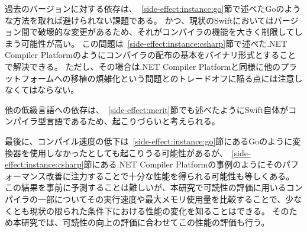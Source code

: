 過去のバージョンに対する依存は、~\ref{side-effect:instance:go}節で述べたGoのような方法を取れば避けられない課題である。
かつ、現状のSwiftにおいてはバージョン間で破壊的な変更があるため、それがコンパイラの機能を大きく制限してしまう可能性が高い。
この問題は~\ref{side-effect:instance:csharp}節で述べた.NET Compiler Platformのようにコンパイラの配布の基本をバイナリ形式とすることで解決できる。
ただし、その場合は.NET Compiler Platformと同様に他のプラットフォームへの移植の煩雑化という問題とのトレードオフに陥る点には注意しなくてはならない。

他の低級言語への依存は、~\ref{side-effect:merit}節でも述べたようにSwift自体がコンパイラ型言語であるため、起こりづらいと考えられる。

最後に、コンパイル速度の低下は~\ref{side-effect:instance:go}節にあるGoのように変換器を使用しなかったとしても起こりうる可能性があるが、~\ref{side-effect:instance:csharp}節にある.NET Compiler Platformの事例のようにそのパフォーマンス改善に注力することで十分な性能を得られる可能性も等しくある。
この結果を事前に予測することは難しいが、本研究で可読性の評価に用いるコンパイラの一部についてその実行速度や最大メモリ使用量を比較することで、少なくとも現状の限られた条件下における性能の変化を知ることはできる。
そのため本研究では、可読性の向上の評価に合わせてこの性能の評価も行う。

